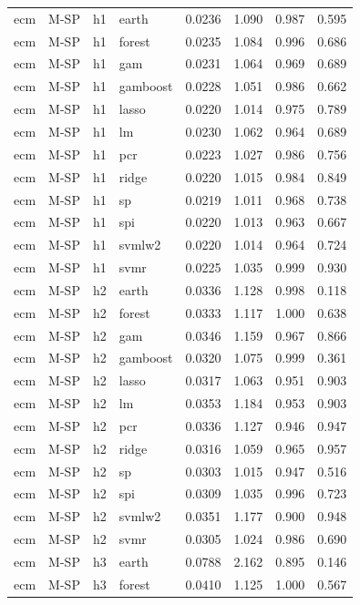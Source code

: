 \begin{ThreePartTable}
\begin{longtable}[t]{llclcccc}
\addlinespace
ecm & M-SP & h1 & earth & 0.0236 & 1.090 & 0.987 & 0.595\\
ecm & M-SP & h1 & forest & 0.0235 & 1.084 & 0.996 & 0.686\\
ecm & M-SP & h1 & gam & 0.0231 & 1.064 & 0.969 & 0.689\\
ecm & M-SP & h1 & gamboost & 0.0228 & 1.051 & 0.986 & 0.662\\
ecm & M-SP & h1 & lasso & 0.0220 & 1.014 & 0.975 & 0.789\\
ecm & M-SP & h1 & lm & 0.0230 & 1.062 & 0.964 & 0.689\\
ecm & M-SP & h1 & pcr & 0.0223 & 1.027 & 0.986 & 0.756\\
ecm & M-SP & h1 & ridge & 0.0220 & 1.015 & 0.984 & 0.849\\
ecm & M-SP & h1 & sp & 0.0219 & 1.011 & 0.968 & 0.738\\
ecm & M-SP & h1 & spi & 0.0220 & 1.013 & 0.963 & 0.667\\
ecm & M-SP & h1 & svmlw2 & 0.0220 & 1.014 & 0.964 & 0.724\\
ecm & M-SP & h1 & svmr & 0.0225 & 1.035 & 0.999 & 0.930\\
\addlinespace
ecm & M-SP & h2 & earth & 0.0336 & 1.128 & 0.998 & 0.118\\
ecm & M-SP & h2 & forest & 0.0333 & 1.117 & 1.000 & 0.638\\
ecm & M-SP & h2 & gam & 0.0346 & 1.159 & 0.967 & 0.866\\
ecm & M-SP & h2 & gamboost & 0.0320 & 1.075 & 0.999 & 0.361\\
ecm & M-SP & h2 & lasso & 0.0317 & 1.063 & 0.951 & 0.903\\
ecm & M-SP & h2 & lm & 0.0353 & 1.184 & 0.953 & 0.903\\
ecm & M-SP & h2 & pcr & 0.0336 & 1.127 & 0.946 & 0.947\\
ecm & M-SP & h2 & ridge & 0.0316 & 1.059 & 0.965 & 0.957\\
ecm & M-SP & h2 & sp & 0.0303 & 1.015 & 0.947 & 0.516\\
ecm & M-SP & h2 & spi & 0.0309 & 1.035 & 0.996 & 0.723\\
ecm & M-SP & h2 & svmlw2 & 0.0351 & 1.177 & 0.900 & 0.948\\
ecm & M-SP & h2 & svmr & 0.0305 & 1.024 & 0.986 & 0.690\\
\addlinespace
ecm & M-SP & h3 & earth & 0.0788 & 2.162 & 0.895 & 0.146\\
ecm & M-SP & h3 & forest & 0.0410 & 1.125 & 1.000 & 0.567\\

\end{longtable}
\end{ThreePartTable}

